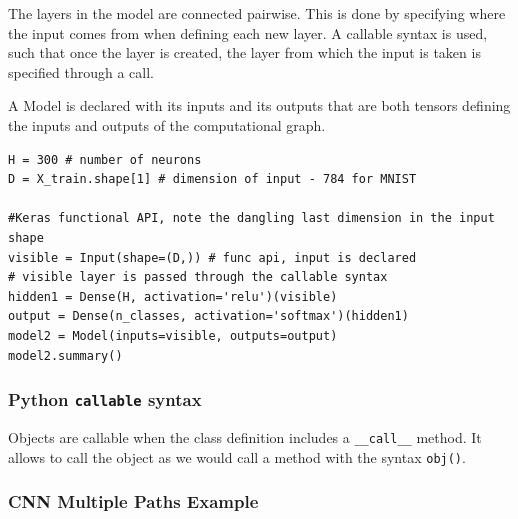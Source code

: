 \documentclass[11pt]{article}
\begin{document}
The layers in the model are connected pairwise. This is done by specifying where the input comes from when defining each new layer. A callable syntax is used, such that once the layer is created, the layer from which the input is taken is specified through a call.

A Model is declared with its inputs and its outputs that are both tensors defining the inputs and outputs of the computational graph.

\begin{verbatim}
H = 300 # number of neurons
D = X_train.shape[1] # dimension of input - 784 for MNIST

#Keras functional API, note the dangling last dimension in the input shape
visible = Input(shape=(D,)) # func api, input is declared
# visible layer is passed through the callable syntax
hidden1 = Dense(H, activation='relu')(visible)
output = Dense(n_classes, activation='softmax')(hidden1)
model2 = Model(inputs=visible, outputs=output)
model2.summary()
\end{verbatim}

\subsubsection{Python \texttt{callable} syntax}
Objects are callable when the class definition includes a \texttt{__call__} method. It allows to call the object as we would call a method with the syntax \texttt{obj()}.

\subsubsection{CNN Multiple Paths Example}
\end{document}

